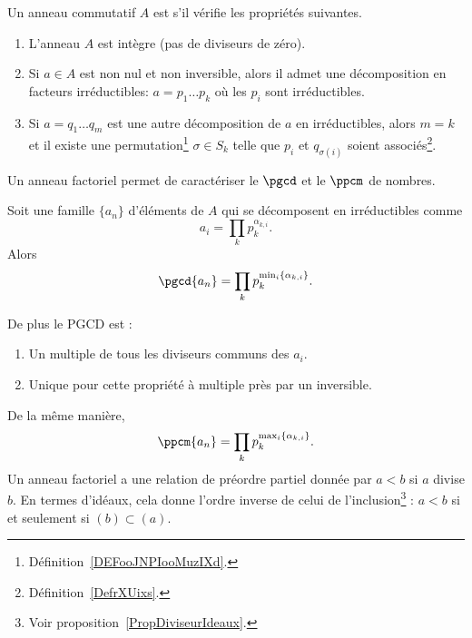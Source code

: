 \begin{definition}        \label{DEFooVCATooPJGWKq}
    Un anneau commutatif \( A\) est  s'il vérifie les propriétés suivantes.
    \begin{enumerate}
        \item
            L'anneau \( A\) est intègre (pas de diviseurs de zéro).
        \item
            Si \( a\in A\) est non nul et non inversible, alors il admet une décomposition en facteurs irréductibles: \( a=p_1\ldots p_k\) où les \( p_i\) sont irréductibles.
        \item
            Si \( a=q_1\ldots q_m\) est une autre décomposition de \( a\) en irréductibles, alors \( m=k\) et il existe une permutation\footnote{Définition~\ref{DEFooJNPIooMuzIXd}.} \( \sigma\in S_k\) telle que \( p_i\) et \( q_{\sigma(i)}\) soient associés\footnote{Définition~\ref{DefrXUixs}.}.
    \end{enumerate}
\end{definition}

Un anneau factoriel permet de caractériser le \( \pgcd\) et le \( \ppcm\) de nombres.

\begin{proposition}
Soit une famille \( \{ a_n \}\) d'éléments de \( A\) qui se décomposent en irréductibles comme
\begin{equation}
    a_i=\prod_k p_k^{\alpha_{k,i}}.
\end{equation}
Alors
\begin{equation}
    \pgcd\{ a_n \}=\prod_k p_k^{\min_i\{ \alpha_{k,i} \}}.
\end{equation}

De plus le PGCD est :
\begin{enumerate}
    \item
        Un multiple de tous les diviseurs communs des \( a_i\).
    \item
        Unique pour cette propriété à multiple près par un inversible.
\end{enumerate}

\end{proposition}

De la même manière,
\begin{equation}
    \ppcm\{ a_n \}=\prod_kp_k^{\max_i\{ \alpha_{k,i} \}}.
\end{equation}
Un anneau factoriel a une relation de préordre partiel donnée par \( a<b\) si \( a\) divise \( b\). En termes d'idéaux, cela donne l'ordre inverse de celui de l'inclusion\footnote{Voir proposition~\ref{PropDiviseurIdeaux}.} : \( a<b\) si et seulement si \( (b)\subset (a)\).

